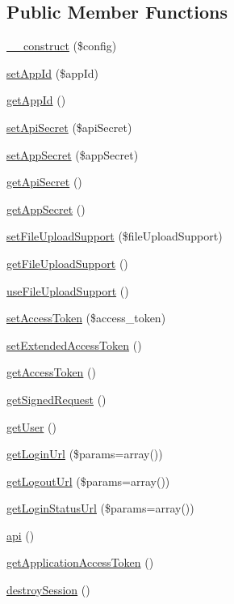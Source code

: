 \subsection*{Public Member Functions}
\begin{DoxyCompactItemize}
\item 
\hyperlink{class_base_facebook_acf2ad978657d47ceab41038dc7d95737}{\-\_\-\-\_\-construct} (\$config)
\item 
\hyperlink{class_base_facebook_aad0d4597cb50b3496cba4cdbd75c5124}{set\-App\-Id} (\$app\-Id)
\item 
\hyperlink{class_base_facebook_a3686abfe34c828287edc1d6a8f77367d}{get\-App\-Id} ()
\item 
\hyperlink{class_base_facebook_aeddeb139aee2996d0c0c2e591490966b}{set\-Api\-Secret} (\$api\-Secret)
\item 
\hyperlink{class_base_facebook_aaf7d6ec22c797af1b2a19074bf3d4bb7}{set\-App\-Secret} (\$app\-Secret)
\item 
\hyperlink{class_base_facebook_aac6b9648bff163abc40d5126505e8f85}{get\-Api\-Secret} ()
\item 
\hyperlink{class_base_facebook_add268d4d266789b864ff44d4311eed0f}{get\-App\-Secret} ()
\item 
\hyperlink{class_base_facebook_a519be2c0a3ea09c70e4d28d383ba5101}{set\-File\-Upload\-Support} (\$file\-Upload\-Support)
\item 
\hyperlink{class_base_facebook_a11a2fe55342959e85616440f6287f24a}{get\-File\-Upload\-Support} ()
\item 
\hyperlink{class_base_facebook_a24dc540eaeaf9845b33d1cfbe9103692}{use\-File\-Upload\-Support} ()
\item 
\hyperlink{class_base_facebook_aa0ee6ee2ce0b07e4fc9a67308fa90f69}{set\-Access\-Token} (\$access\-\_\-token)
\item 
\hyperlink{class_base_facebook_a4d147276ed1d8846a2f72b64922ebbc3}{set\-Extended\-Access\-Token} ()
\item 
\hyperlink{class_base_facebook_a5d251c70a3f9f9daaff7f00ec5f894c0}{get\-Access\-Token} ()
\item 
\hyperlink{class_base_facebook_aa89cc38937ab8f8f132f3712c49c6e37}{get\-Signed\-Request} ()
\item 
\hyperlink{class_base_facebook_ae81b7186fb97a7c6457edcc68c9aa2ef}{get\-User} ()
\item 
\hyperlink{class_base_facebook_a4695950a8d2440dcb829bc4c535ec744}{get\-Login\-Url} (\$params=array())
\item 
\hyperlink{class_base_facebook_af5ef059f8a2b583a3f774970b63db46f}{get\-Logout\-Url} (\$params=array())
\item 
\hyperlink{class_base_facebook_a6313d2d56136e4d5d25ede42e9ec9eee}{get\-Login\-Status\-Url} (\$params=array())
\item 
\hyperlink{class_base_facebook_aa238fcc5cb30759876aa89cd2e0711c1}{api} ()
\item 
\hyperlink{class_base_facebook_aa9aad274cdcdf95d01e679ad39ab024e}{get\-Application\-Access\-Token} ()
\item 
\hyperlink{class_base_facebook_a9aea96aaeaf1efd5531eb1867ee67ca6}{destroy\-Session} ()
\end{DoxyCompactItemize}
